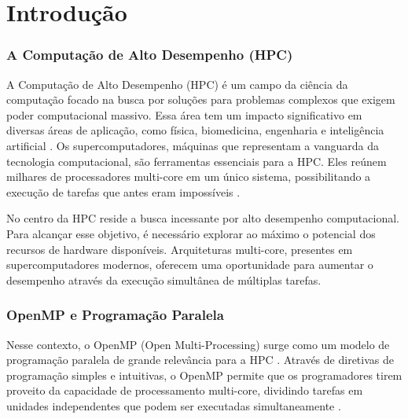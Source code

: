 \documentclass[ppgc,diss]{iiufrgs}
\begin{document}


\listoftables

\tableofcontents


\chapter{Introdução}
\subsection{A Computação de Alto Desempenho (HPC)}
A Computação de Alto Desempenho (HPC) é um campo da ciência da computação focado na busca por soluções para problemas complexos que exigem poder computacional massivo. Essa área tem um impacto significativo em diversas áreas de aplicação, como física, biomedicina, engenharia e inteligência artificial \citep{Chapman2007UsingOpenMP}.
Os supercomputadores, máquinas que representam a vanguarda da tecnologia computacional, são ferramentas essenciais para a HPC. Eles reúnem milhares de processadores multi-core em um único sistema, possibilitando a execução de tarefas que antes eram impossíveis \citep{Geimer2010SCALASCA}.

No centro da HPC reside a busca incessante por alto desempenho computacional. Para alcançar esse objetivo, é necessário explorar ao máximo o potencial dos recursos de hardware disponíveis. Arquiteturas multi-core, presentes em supercomputadores modernos, oferecem uma oportunidade para aumentar o desempenho através da execução simultânea de múltiplas tarefas.

\subsection{OpenMP e Programação Paralela}
Nesse contexto, o OpenMP (Open Multi-Processing) surge como um modelo de programação paralela de grande relevância para a HPC \cite{Dagum1998OpenMP}. Através de diretivas de programação simples e intuitivas, o OpenMP permite que os programadores tirem proveito da capacidade de processamento multi-core, dividindo tarefas em unidades independentes que podem ser executadas simultaneamente \cite{Schmidl2013Assessing}.
\end{document}
